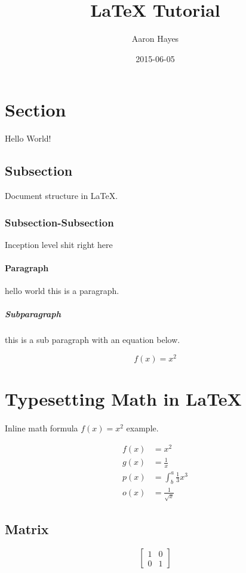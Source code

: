 \documentclass{article}
\title{LaTeX Tutorial}
\date{2015-06-05}
\author{Aaron Hayes}
\begin{document}
\maketitle
{}
\newpage
{}

\tableofcontents
\newpage

\section{Section}
 Hello World!
 \subsection{Subsection}
  Document structure in LaTeX.
  \subsubsection{Subsection-Subsection}
  Inception level shit right here

  \paragraph{Paragraph}
  hello world this is a paragraph.

  \subparagraph{Subparagraph}
  this is a sub paragraph with an equation below.

  \begin{equation}
    f(x) = x^2
  \end{equation}

\newpage
\section{Typesetting Math in LaTeX}
  \paragraph{}
  Inline math formula $f(x) = x^2$ example.

  \begin{align*}
    f(x) &= x^2\\
    g(x) &= \frac{1}{x}\\
    p(x) &= \int^a_b \frac{1}{3}x^3\\
    o(x) &= \frac{1}{\sqrt{x}}
  \end{align*}

  \subsection{Matrix}
  \begin{equation*}
    \left[
    \begin{matrix}
      1 & 0\\
      0 & 1
    \end{matrix}
    \right]
  \end{equation*}
\end{document}
